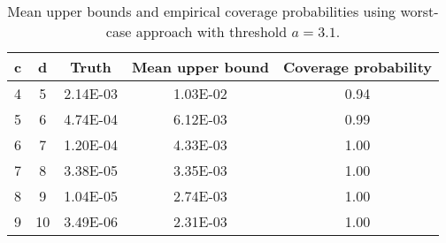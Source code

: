 \begin{table}[ht]
\centering
\begin{tabular}{ccccc}
  \hline
c & d & Truth & Mean upper bound & Coverage probability \\ 
  \hline
  4 &   5 & 2.14E-03 & 1.03E-02 & 0.94 \\ 
    5 &   6 & 4.74E-04 & 6.12E-03 & 0.99 \\ 
    6 &   7 & 1.20E-04 & 4.33E-03 & 1.00 \\ 
    7 &   8 & 3.38E-05 & 3.35E-03 & 1.00 \\ 
    8 &   9 & 1.04E-05 & 2.74E-03 & 1.00 \\ 
    9 &  10 & 3.49E-06 & 2.31E-03 & 1.00 \\ 
   \hline
\end{tabular}
\caption{Mean upper bounds and empirical coverage probabilities using worst-case approach with threshold $a = 3.1$.} 
\label{Tab:robustnessOptim}
\end{table}
